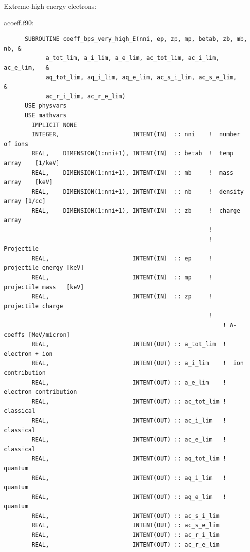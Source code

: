 \documentclass[preprint,12pt,eqsecnum,nofootinbib,amsmath,amssymb]{revtex4}
\begin{document}
\noindent
Extreme-high energy electrons:

\vskip1cm
\noindent
acoeff.f90:
{
\baselineskip 10pt
\begin{verbatim}
      SUBROUTINE coeff_bps_very_high_E(nni, ep, zp, mp, betab, zb, mb, nb, &
            a_tot_lim, a_i_lim, a_e_lim, ac_tot_lim, ac_i_lim, ac_e_lim,   &
            aq_tot_lim, aq_i_lim, aq_e_lim, ac_s_i_lim, ac_s_e_lim,        &
            ac_r_i_lim, ac_r_e_lim)
      USE physvars
      USE mathvars      
        IMPLICIT NONE
        INTEGER,                     INTENT(IN)  :: nni    !  number of ions
        REAL,    DIMENSION(1:nni+1), INTENT(IN)  :: betab  !  temp array    [1/keV]
        REAL,    DIMENSION(1:nni+1), INTENT(IN)  :: mb     !  mass array    [keV]
        REAL,    DIMENSION(1:nni+1), INTENT(IN)  :: nb     !  density array [1/cc]
        REAL,    DIMENSION(1:nni+1), INTENT(IN)  :: zb     !  charge array
                                                           !
                                                           ! Projectile  
        REAL,                        INTENT(IN)  :: ep     !  projectile energy [keV]
        REAL,                        INTENT(IN)  :: mp     !  projectile mass   [keV]
        REAL,                        INTENT(IN)  :: zp     !  projectile charge
                                                           !
                                                               ! A-coeffs [MeV/micron]
        REAL,                        INTENT(OUT) :: a_tot_lim  !  electron + ion
        REAL,                        INTENT(OUT) :: a_i_lim    !  ion contribution
        REAL,                        INTENT(OUT) :: a_e_lim    !  electron contribution
        REAL,                        INTENT(OUT) :: ac_tot_lim !  classical
        REAL,                        INTENT(OUT) :: ac_i_lim   !  classical
        REAL,                        INTENT(OUT) :: ac_e_lim   !  classical
        REAL,                        INTENT(OUT) :: aq_tot_lim !  quantum
        REAL,                        INTENT(OUT) :: aq_i_lim   !  quantum
        REAL,                        INTENT(OUT) :: aq_e_lim   !  quantum
        REAL,                        INTENT(OUT) :: ac_s_i_lim
        REAL,                        INTENT(OUT) :: ac_s_e_lim
        REAL,                        INTENT(OUT) :: ac_r_i_lim
        REAL,                        INTENT(OUT) :: ac_r_e_lim


\end{verbatim}}
\end{document}
